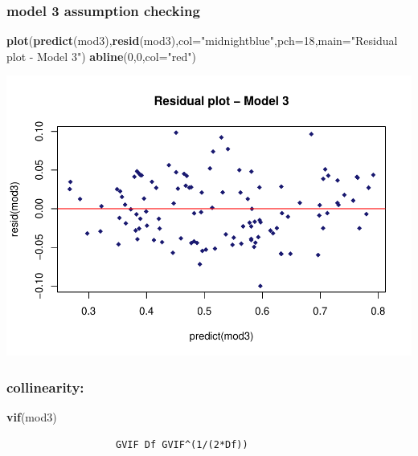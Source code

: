 \documentclass[
]{article}
\newenvironment{Shaded}{\begin{snugshade}}{\end{snugshade}}
\newcommand{\DataTypeTok}[1]{\textcolor[rgb]{0.13,0.29,0.53}{#1}}
\newcommand{\DecValTok}[1]{\textcolor[rgb]{0.00,0.00,0.81}{#1}}
\newcommand{\KeywordTok}[1]{\textcolor[rgb]{0.13,0.29,0.53}{\textbf{#1}}}
\newcommand{\NormalTok}[1]{#1}
\newcommand{\StringTok}[1]{\textcolor[rgb]{0.31,0.60,0.02}{#1}}
\begin{document}
\hypertarget{model-3-assumption-checking}{%
\subsubsection{model 3 assumption
checking}\label{model-3-assumption-checking}}

\begin{Shaded}
\begin{Highlighting}[]
\KeywordTok{plot}\NormalTok{(}\KeywordTok{predict}\NormalTok{(mod3),}\KeywordTok{resid}\NormalTok{(mod3),}\DataTypeTok{col=}\StringTok{"midnightblue"}\NormalTok{,}\DataTypeTok{pch=}\DecValTok{18}\NormalTok{,}\DataTypeTok{main=}\StringTok{"Residual plot - Model 3"}\NormalTok{)}
\KeywordTok{abline}\NormalTok{(}\DecValTok{0}\NormalTok{,}\DecValTok{0}\NormalTok{,}\DataTypeTok{col=}\StringTok{"red"}\NormalTok{)}
\end{Highlighting}
\end{Shaded}

\includegraphics{Zhong_paper_files/figure-latex/unnamed-chunk-11-1.pdf}

\hypertarget{collinearity-1}{%
\subsubsection{collinearity:}\label{collinearity-1}}

\begin{Shaded}
\begin{Highlighting}[]
\KeywordTok{vif}\NormalTok{(mod3)}
\end{Highlighting}
\end{Shaded}

\begin{verbatim}
                   GVIF Df GVIF^(1/(2*Df))
\end{verbatim}
\end{document}
